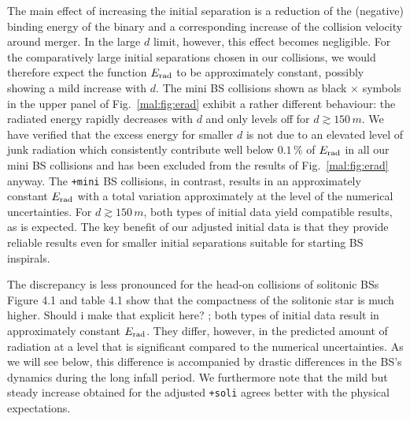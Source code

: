 The main effect of increasing the initial separation is a
reduction of the (negative) binding energy of the binary and a corresponding
increase of the collision velocity around merger. In the large
$d$ limit, however, this effect becomes negligible. For the
comparatively large initial separations chosen in our
collisions, we would therefore
expect the function $E_{\rm rad}$ to be approximately constant,
possibly showing a mild increase with $d$. The mini BS collisions
shown as black $\times$ symbols in the upper panel of
Fig.~\ref{mal:fig:erad} exhibit a rather different behaviour:
the radiated energy rapidly decreases with $d$ and only levels
off for $d\gtrsim 150\,m$. We have verified that the excess
energy for smaller $d$ is not due to an elevated level of
junk radiation which consistently contribute well below
$0.1\,\%$ of $E_{\rm rad}$ in all our mini BS collisions and has
been excluded from the results of Fig.~\ref{mal:fig:erad} anyway.
The {\tt +mini} BS collisions,
in contrast, results in an approximately constant $E_{\rm rad}$
with a total variation approximately at the level of the
numerical uncertainties. For $d\gtrsim 150\,m$, both types of
initial data yield compatible results, as is expected.
The key benefit of our adjusted initial data is that they provide
reliable results even for smaller initial separations suitable
for starting BS inspirals.

The discrepancy is less pronounced for the head-on collisions
of solitonic BSs \color{choral} Figure 4.1 and table 4.1 show that
the compactness of the solitonic star is much higher. Should i make that 
explicit here? \color{black}; both types of initial data result
in approximately constant $E_{\rm rad}$. They differ, however,
in the predicted amount of radiation at a level that
is significant compared to
the numerical uncertainties. As we will see below, this difference
is accompanied by drastic differences in the BS's dynamics during the
long infall period. We furthermore note that the mild but
steady increase obtained for the adjusted {\tt +soli} agrees
better with the physical expectations.


